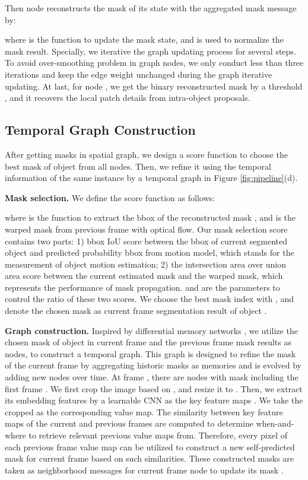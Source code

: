 \documentclass[letterpaper]{article} \usepackage{aaai21}  \usepackage{times}  \usepackage{helvet} \usepackage{courier}  \usepackage[hyphens]{url}  \usepackage{graphicx} \urlstyle{rm} \def\UrlFont{\rm}  \usepackage{graphicx}  \usepackage{natbib}  \usepackage{caption} \frenchspacing  \setlength{\pdfpagewidth}{8.5in}  \setlength{\pdfpageheight}{11in}  \usepackage{amsmath}
\begin{document}
Then node  reconstructs the mask of its state with the aggregated mask message  by:

where  is the function to update the mask state, and  is used to normalize the mask result.
Specially, we iterative the graph updating process for several steps.
To avoid over-smoothing problem \cite{li2018deeper} in graph nodes, we only conduct less than three iterations and keep the edge weight  unchanged during the graph iterative updating. 
At last, for node , we get the binary reconstructed mask  by a threshold , and it recovers the local patch details from intra-object proposals.

\subsection{Temporal Graph Construction}
After getting masks  in spatial graph, we design a score function to choose the best mask of object  from all nodes. Then, we refine it using the temporal information of the same instance by a temporal graph in Figure \ref{fig:pipeline}(d).

\noindent \textbf{Mask selection.}
We define the score function as follows:

where  is the function to extract the bbox of the reconstructed mask , and  is the warped mask from previous frame with optical flow. Our mask selection score contains two parts: 1) bbox IoU score between the bbox of current segmented object and predicted probability bbox  from motion model, which stands for the measurement of object motion estimation; 2) the intersection area over union area score between the current estimated mask and the warped mask, which represents the performance of mask propagation.  and  are the parameters to control the ratio of these two scores. We choose the best mask index  with , and denote the chosen mask as current frame segmentation result  of object .

\noindent \textbf{Graph construction.}
Inspired by differential memory networks \cite{vaswani2017attention,sukhbaatar2015end}, we utilize the chosen mask of object  in current frame and the previous frame mask results as nodes, to construct a temporal graph. This graph is designed to refine the mask of the current frame by aggregating historic masks as memories and is evolved by adding new nodes over time. At frame , there are  nodes with mask  including the first frame . 
We first crop the image  based on , and resize it to . Then, we
extract its embedding features by a learnable CNN as the key feature maps . We take the cropped  as the corresponding value map. 
The similarity between key feature maps of the current and previous frames are computed to determine when-and-where to retrieve relevant previous value maps from. Therefore, every pixel of each previous frame value map can be utilized to construct a new self-predicted mask for current frame based on such similarities. These constructed masks are taken as neighborhood messages  for current frame node  to update its mask . 
\end{document}
